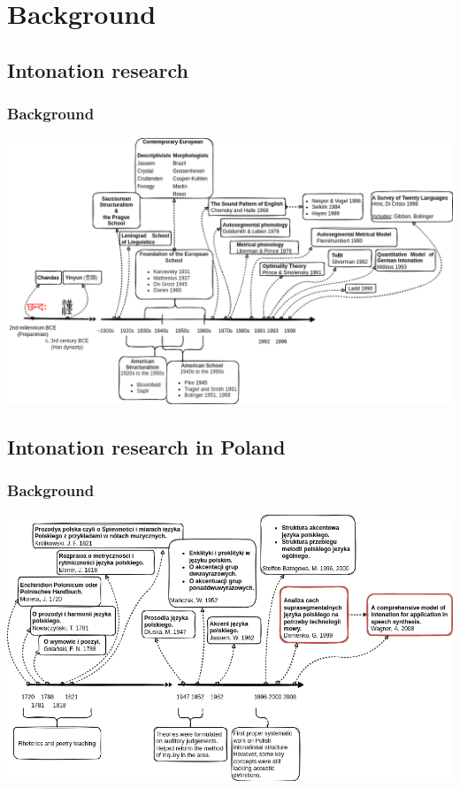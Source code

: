 \documentclass[a4paper,9pt]{beamer}
\theoremstyle{mytheoremstyle}
\begin{document}
\section{Background}



\subsection{Intonation research}
\begin{frame}
\frametitle{Background}
\includegraphics[width=\textwidth]{res/background.png}
\end{frame}

\subsection{Intonation research in Poland}
\begin{frame}
\frametitle{Background}
\includegraphics[width=\textwidth]{res/intonation_background_pl.png}
\end{frame}
\end{document}
